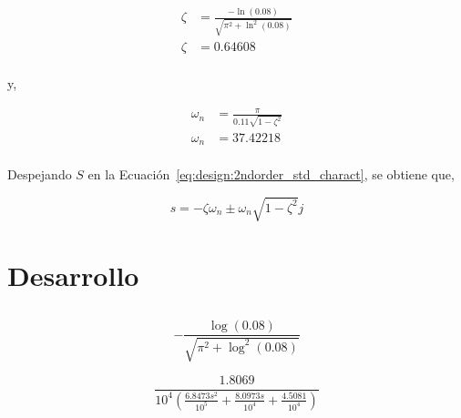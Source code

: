 \documentclass[12pt,a4paper]{article}
\begin{document}
        \begin{equation*}
          \begin{aligned}
            \zeta &= \frac{-\ln\left(0.08\right)}{\sqrt{\pi^{2} + \ln^{2}\left(0.08\right)}} \\
            \zeta &= 0.64608 \\
          \end{aligned}
        \end{equation*}

        y, 

        \begin{equation*}
          \begin{aligned}
            \omega_{n} &= \frac{\pi}{0.11\sqrt{1-\zeta^{2}}} \\ 
            \omega_{n} &= 37.42218 \\
          \end{aligned}
        \end{equation*}
        
        Despejando $ S $ en la Ecuación~\ref{eq:design:2ndorder_std_charact}, se obtiene que, 

        \begin{equation}
          s = -\zeta\omega_{n} \pm \omega_{n}\sqrt{1 - \zeta^{2}}j
          \label{eq:design:charact_sval}
        \end{equation}


        \label{eq:design:charact_subs}
	\pagebreak
	
	\section{Desarrollo}

    \subsection{}
	
  $$ -\frac{\log (0.08)}{\sqrt{\pi ^2+\log ^2(0.08)}} $$

  $$ \frac{1.8069}{10^4 \left(\frac{6.8473 s^2}{10^5}+\frac{8.0973 s}{10^4}+\frac{4.5081}{10^4}\right)} $$
	
\end{document}
